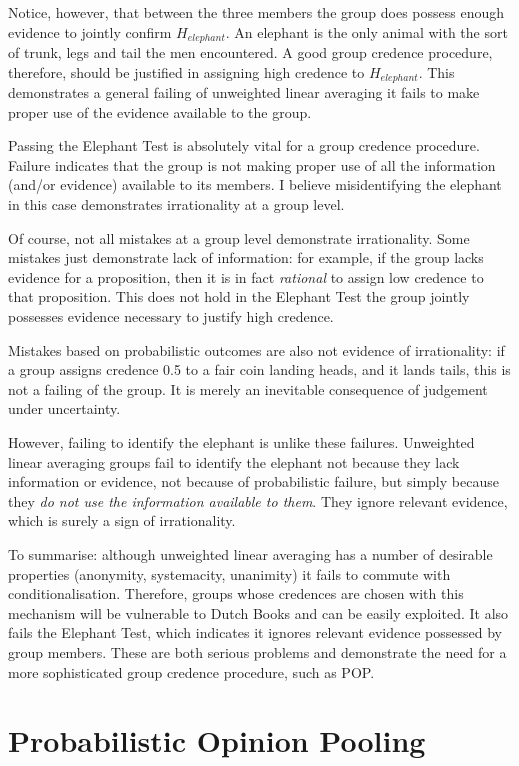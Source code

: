 \documentclass{article}
\begin{document}
Notice, however, that between the three members the group does possess enough evidence to jointly confirm \(H_{elephant}\). An elephant is the only animal with the sort of trunk, legs and tail the men encountered. A good group credence procedure, therefore, should be justified in assigning high credence to \(H_{elephant}\). This demonstrates a general failing of unweighted linear averaging \textemdash{} it fails to make proper use of the evidence available to the group. 

Passing the Elephant Test is absolutely vital for a group credence procedure. Failure indicates that the group is not making proper use of all the information (and/or evidence) available to its members. I believe misidentifying the elephant in this case demonstrates irrationality at a group level. 

Of course, not all mistakes at a group level demonstrate irrationality. Some mistakes just demonstrate lack of information: for example, if the group lacks evidence for a proposition, then it is in fact \textit{rational} to assign low credence to that proposition. This does not hold in the Elephant Test \textemdash{} the group jointly possesses evidence necessary to justify high credence. 

Mistakes based on probabilistic outcomes are also not evidence of irrationality: if a group assigns credence 0.5 to a fair coin landing heads, and it lands tails, this is not a failing of the group. It is merely an inevitable consequence of judgement under uncertainty. 

However, failing to identify the elephant is unlike these failures. Unweighted linear averaging groups fail to identify the elephant not because they lack information or evidence, not because of probabilistic failure, but simply because they \textit{do not use the information available to them}. They ignore relevant evidence, which is surely a sign of irrationality.

To summarise: although unweighted linear averaging has a number of desirable properties (anonymity, systemacity, unanimity) it fails to commute with conditionalisation. Therefore, groups whose credences are chosen with this mechanism will be vulnerable to Dutch Books and can be easily exploited. It also fails the Elephant Test, which indicates it ignores relevant evidence possessed by group members. These are both serious problems and demonstrate the need for a more sophisticated group credence procedure, such as POP.

\section{Probabilistic Opinion Pooling}
\end{document}
